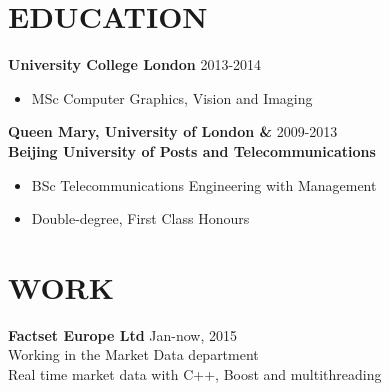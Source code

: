 \documentclass[line,margin]{res}
\begin{document}
\address{}
\address{}

\begin{resume}
\renewcommand{\labelitemi}{-}


\section{EDUCATION} 
{\bf University College London} \hfill{\textcolor[rgb]{0.7,0.7,0.7}{2013-2014}}
\begin{itemize}\itemsep -2pt %
    \item MSc Computer Graphics, Vision and Imaging
\end{itemize}

{\bf Queen Mary, University of London \&} \hfill{\textcolor[rgb]{0.7,0.7,0.7}{2009-2013}}\\
{\bf Beijing University of Posts and Telecommunications}
\begin{itemize}\itemsep -2pt %
    \item BSc Telecommunications Engineering with Management
    \item Double-degree, First Class Honours
\end{itemize}



\section{WORK}
{\bf Factset Europe Ltd}
\hfill{\textcolor[rgb]{0.7,0.7,0.7}{Jan-now, 2015}}\\
Working in the Market Data department\\
Real time market data with C++, Boost and multithreading



\end{resume}
\end{document}
